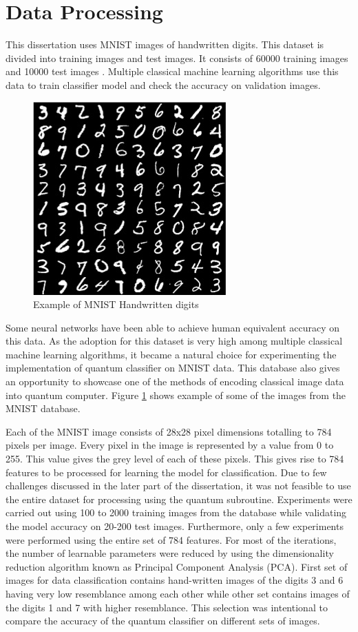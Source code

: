 \documentclass[english,a4paper,11pt,oneside,onecolumn]{book}
\begin{document}
\section{Data Processing}
\label{sec:dataprocess}
This dissertation uses MNIST images of handwritten digits. This dataset is divided into training images and test images. It consists of 60000 training images and 10000 test images \cite{kussul_2004_improved}. Multiple classical machine learning algorithms use this data to train classifier model and check the accuracy on validation images.

\begin{figure}[H]
    \centering
    \includegraphics{Images/MnistExamples.jpg}
    \caption{Example of MNIST Handwritten digits}
    \label{fig:mnistEg}
\end{figure}

Some neural networks have been able to achieve human equivalent accuracy on this data. As the adoption for this dataset is very high among multiple classical machine learning algorithms, it became a natural choice for experimenting the implementation of quantum classifier on MNIST data. This database also gives an opportunity to showcase one of the methods of encoding classical image data into quantum computer. Figure \ref{fig:mnistEg} shows example of some of the images from the MNIST database. 

Each of the MNIST image consists of 28x28 pixel dimensions totalling to 784 pixels per image. Every pixel in the image is represented by a value from 0 to 255. This value gives the grey level of each of these pixels. This gives rise to 784 features to be processed for learning the model for classification. Due to few challenges discussed in the later part of the dissertation, it was not feasible to use the entire dataset for processing using the quantum subroutine. Experiments were carried out using 100 to 2000 training images from the database while validating the model accuracy on 20-200 test images. Furthermore, only a few experiments were performed using the entire set of 784 features. For most of the iterations, the number of learnable parameters were reduced by using the dimensionality reduction algorithm known as Principal Component Analysis (PCA). First set of images for data classification contains hand-written images of the digits 3 and 6 having very low resemblance among each other while other set contains images of the digits 1 and 7 with higher resemblance. This selection was intentional to compare the accuracy of the quantum classifier on different sets of images.
\end{document}
